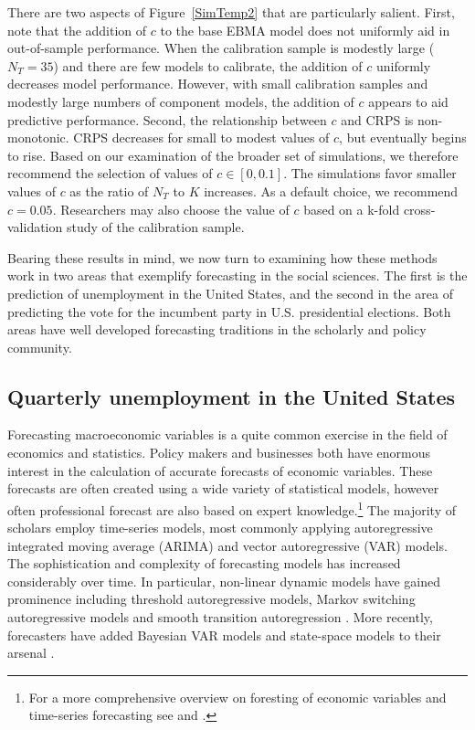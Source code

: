 \documentclass[12pt,fullpage,endnotes]{article}
\begin{document}
There are two aspects of Figure~\ref{SimTemp2} that are particularly
salient.  First, note that the addition of $c$ to the base EBMA
model does not uniformly aid in out-of-sample performance.  When the
calibration sample is modestly large ($N_T=35$) and there are few
models to calibrate, the addition of $c$ uniformly decreases model
performance.  However, with small calibration samples and modestly
large numbers of component models, the addition of $c$ appears to aid
predictive performance.  Second, the relationship between $c$ and CRPS
is non-monotonic.  CRPS decreases for small to modest values of $c$,
but eventually begins to rise.  Based on our examination of the
broader set of simulations, we therefore recommend the selection of
values of $c \in [0, 0.1]$.  The simulations favor smaller values of
$c$ as the ratio of $N_T$ to $K$ increases.  As a default choice, we
recommend $c=0.05$.  Researchers may also choose the value of $c$
based on a k-fold cross-validation study of the calibration sample.

Bearing these results in mind, we now turn to examining how these
methods work in two areas that exemplify forecasting in the social
sciences. The first is the prediction of unemployment in the United
States, and the second in the area of predicting the vote for the
incumbent party in U.S. presidential elections. Both areas have well
developed forecasting traditions in the scholarly and policy
community.


\subsection{Quarterly unemployment in the United States}
\label{econ}

Forecasting macroeconomic variables is a quite common exercise in the
field of economics and statistics. Policy makers and
businesses both have enormous interest in the calculation of accurate forecasts of economic variables. These forecasts are often created using a wide variety of
statistical models, however often professional forecast are also based on expert knowledge.\footnote{For a more comprehensive overview on
  foresting of economic variables and time-series forecasting see
  \citet{Elliott:Timmermann:2008} and \citet{Goijer:Hyndman:2006}.}
The majority of scholars employ time-series models, most commonly applying autoregressive integrated
moving average (ARIMA) and vector autoregressive (VAR) models. The
sophistication and complexity of forecasting models has increased
considerably over time. In particular, non-linear dynamic models have
gained prominence including threshold autoregressive models, Markov
switching autoregressive models and smooth transition autoregression
\citep{Elliott:Timmermann:2008,Montgomery:etal:1998}. More recently,
forecasters have added Bayesian VAR models and state-space models
to their arsenal \citep{Goijer:Hyndman:2006,Elliott:Timmermann:2008}.
\end{document}
